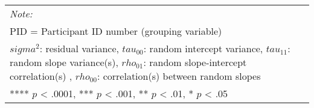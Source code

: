 \begin{landscape}
\begin{table}
\begin{minipage}[t][\textheight][t]{\textwidth}
{\begin{tabular}[t]{lcccccccccccccccccccccccccc}
\bottomrule
\multicolumn{27}{l}{\rule{0pt}{1em}\textit{Note: }}\\
\multicolumn{27}{l}{\rule{0pt}{1em}PID = Participant ID number (grouping variable)}\\
\multicolumn{27}{l}{\rule{0pt}{1em}$sigma^2$: residual variance, $tau_{00}$: random intercept variance, $tau_{11}$: random slope variance(s), $rho_{01}$: random slope-intercept correlation(s) , $rho_{00}$: correlation(s) between random slopes}\\
\multicolumn{27}{l}{\rule{0pt}{1em}**** $p$ < .0001, *** $p$ < .001, ** $p$ < .01, * $p$ < .05}\\
\end{tabular}}
\end{minipage}
\end{table}
\end{landscape}
